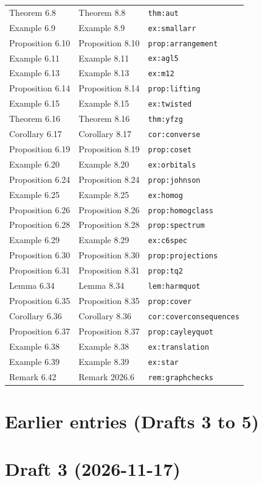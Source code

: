 \documentclass[12pt,letterpaper]{article}
\begin{document}
\begin{longtable}{@{}lll@{}}
Theorem 6.8 & Theorem 8.8 & \texttt{thm:aut}\\
Example 6.9 & Example 8.9 & \texttt{ex:smallarr}\\
Proposition 6.10 & Proposition 8.10 & \texttt{prop:arrangement}\\
Example 6.11 & Example 8.11 & \texttt{ex:agl5}\\
Example 6.13 & Example 8.13 & \texttt{ex:m12}\\
Proposition 6.14 & Proposition 8.14 & \texttt{prop:lifting}\\
Example 6.15 & Example 8.15 & \texttt{ex:twisted}\\
Theorem 6.16 & Theorem 8.16 & \texttt{thm:yfzg}\\
Corollary 6.17 & Corollary 8.17 & \texttt{cor:converse}\\
Proposition 6.19 & Proposition 8.19 & \texttt{prop:coset}\\
Example 6.20 & Example 8.20 & \texttt{ex:orbitals}\\
Proposition 6.24 & Proposition 8.24 & \texttt{prop:johnson}\\
Example 6.25 & Example 8.25 & \texttt{ex:homog}\\
Proposition 6.26 & Proposition 8.26 & \texttt{prop:homogclass}\\
Proposition 6.28 & Proposition 8.28 & \texttt{prop:spectrum}\\
Example 6.29 & Example 8.29 & \texttt{ex:c6spec}\\
Proposition 6.30 & Proposition 8.30 & \texttt{prop:projections}\\
Proposition 6.31 & Proposition 8.31 & \texttt{prop:tq2}\\
Lemma 6.34 & Lemma 8.34 & \texttt{lem:harmquot}\\
Proposition 6.35 & Proposition 8.35 & \texttt{prop:cover}\\
Corollary 6.36 & Corollary 8.36 & \texttt{cor:coverconsequences}\\
Proposition 6.37 & Proposition 8.37 & \texttt{prop:cayleyquot}\\
Example 6.38 & Example 8.38 & \texttt{ex:translation}\\
Example 6.39 & Example 8.39 & \texttt{ex:star}\\
Remark 6.42 & Remark 2026.6 & \texttt{rem:graphchecks}\\
\bottomrule
\end{longtable}

\section{Earlier entries (Drafts 3 to 5)}
\hypertarget{revision-log-draft-3-2026-11-17}{%
\section*{Draft 3
(2026-11-17)}\label{revision-log-draft-3-2026-11-17}}
\end{document}
